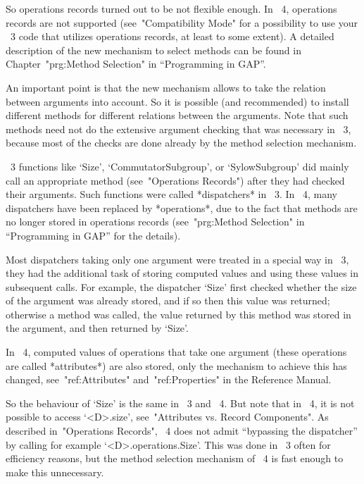 So operations records turned out to be not flexible enough.  In
{\GAP}~4, operations records are not supported (see~"Compatibility
Mode" for a possibility to use your {\GAP}~3 code that utilizes
operations records, at least to some extent).  A detailed description
of the new mechanism to select methods can be found in
Chapter~"prg:Method Selection" in ``Programming in GAP''.

An important point is that the new mechanism allows {\GAP} to take the
relation between arguments into account.  So it is possible (and
recommended) to install different methods for different relations
between the arguments.  Note that such methods need not do the
extensive argument checking that was necessary in {\GAP}~3, because
most of the checks are done already by the method selection mechanism.



{\GAP}~3 functions like `Size', `CommutatorSubgroup', or
`SylowSubgroup' did mainly call an appropriate method (see~"Operations
Records") after they had checked their arguments.  Such functions were
called *dispatchers* in {\GAP}~3.  In {\GAP}~4, many dispatchers have
been replaced by *operations*, due to the fact that methods are no
longer stored in operations records (see~"prg:Method Selection" in
``Programming in GAP'' for the details).

Most dispatchers taking only one argument were treated in a special
way in {\GAP}~3, they had the additional task of storing computed
values and using these values in subsequent calls.  For example, the
dispatcher `Size' first checked whether the size of the argument was
already stored, and if so then this value was returned; otherwise a
method was called, the value returned by this method was stored in the
argument, and then returned by `Size'.

In {\GAP}~4, computed values of operations that take one argument
(these operations are called *attributes*) are also stored, only the
mechanism to achieve this has changed, see~"ref:Attributes"
and~"ref:Properties" in the Reference Manual.

So the behaviour of `Size' is the same in {\GAP}~3 and {\GAP}~4.  But
note that in {\GAP}~4, it is not possible to access `<D>.size',
see~"Attributes vs. Record Components".  As described in~"Operations
Records", {\GAP}~4 does not admit ``bypassing the dispatcher'' by
calling for example `<D>.operations.Size'.  This was done in {\GAP}~3
often for efficiency reasons, but the method selection mechanism of
{\GAP}~4 is fast enough to make this unnecessary.

